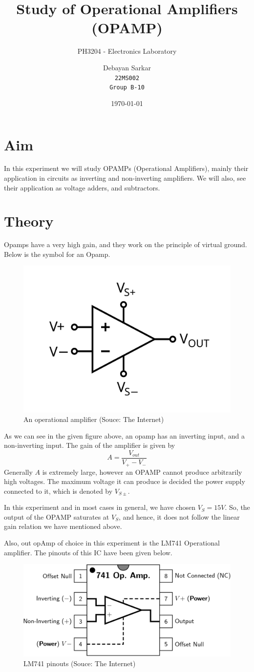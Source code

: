 \documentclass[10pt]{scrartcl}
\title{Study of Operational Amplifiers (OPAMP)}
\subtitle{PH3204 - Electronics Laboratory}
\author{Debayan Sarkar \\ \texttt{22MS002} \\ \texttt{Group B-10}}
\date{\today}
\theoremstyle{definition}
\begin{document}
\maketitle
\section{Aim}
In this experiment we will study OPAMPs (Operational Amplifiers), mainly their application
in circuits as inverting and non-inverting amplifiers. We will also, see their application as 
voltage adders, and subtractors.
\section{Theory}
Opamps have a very high gain, and they work on the principle of virtual ground. Below is the 
symbol for an Opamp.

\begin{figure}[!h]
    \centering
    \includegraphics[width=0.3\linewidth]{opamp.png}
    \caption{An operational amplifier (Souce: The Internet)}
\end{figure}
As we can see in the given figure above, an opamp has an inverting input, and a non-inverting input.
The gain of the amplifier is given by
$$A = \frac{V_{out}}{V_+ - V_-}$$
Generally $A$ is extremely large, however an OPAMP cannot produce arbitrarily high voltages. The 
maximum voltage it can produce is decided the power supply connected to it, which is denoted by $V_{S\pm}$.

In this experiment and in most cases in general, we have chosen $V_S = 15 V$. So, the output of the 
OPAMP saturates at $V_S$, and hence, it does not follow the linear gain relation we have mentioned above.

Also, out opAmp of choice in this experiment is the LM741 Operational amplifier. The pinouts of this
IC have been given below.

\begin{figure}[!h]
    \centering
    \includegraphics[width=0.3\linewidth]{opampic741.png}
    \caption{LM741 pinouts (Souce: The Internet)}
\end{figure}
\pagebreak
\end{document}
